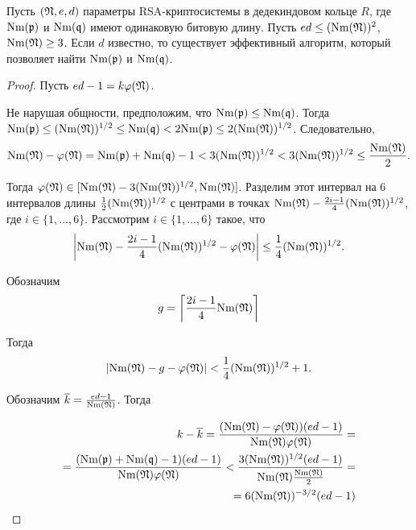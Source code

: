 \documentclass[_00_dissertation.tex]{subfiles}
\begin{document}
\begin{theorem}\label{theorem:d_is_known_2}
    Пусть $(\mathfrak{N}, e, d)$ параметры RSA-криптосистемы в дедекиндовом кольце $R$, где $\textrm{Nm}(\mathfrak{p})$ и $\textrm{Nm}(\mathfrak{q})$ имеют одинаковую битовую длину.
    Пусть $ed \le (\textrm{Nm}(\mathfrak{N}))^2$, $\textrm{Nm}(\mathfrak{N}) \ge 3$.
    Если $d$ известно, то существует эффективный алгоритм, который позволяет найти $\textrm{Nm}(\mathfrak{p})$ и $\textrm{Nm}(\mathfrak{q})$.
\end{theorem}
\begin{proof}
    Пусть $ed - 1 = k\varphi(\mathfrak{N})$.

    Не нарушая общности, предположим, что $\textrm{Nm}(\mathfrak{p}) \le \textrm{Nm}(\mathfrak{q})$.
    Тогда $\textrm{Nm}(\mathfrak{p}) \le (\textrm{Nm}(\mathfrak{N}))^{1/2} \le \textrm{Nm}(\mathfrak{q}) < 2\textrm{Nm}(\mathfrak{p}) \le 2(\textrm{Nm}(\mathfrak{N}))^{1/2}$.
    Следовательно,
    \begin{equation*}
        \textrm{Nm}(\mathfrak{N}) - \varphi(\mathfrak{N}) = \textrm{Nm}(\mathfrak{p}) + \textrm{Nm}(\mathfrak{q}) - 1 < 3(\textrm{Nm}(\mathfrak{N}))^{1/2} < 3(\textrm{Nm}(\mathfrak{N}))^{1/2} \le \frac{\textrm{Nm}(\mathfrak{N})}{2}.
    \end{equation*}

    Тогда $\varphi(\mathfrak{N}) \in [\textrm{Nm}(\mathfrak{N})-3(\textrm{Nm}(\mathfrak{N}))^{1/2}, \textrm{Nm}(\mathfrak{N})]$.
    Разделим этот интервал на $6$ интервалов длины $\frac{1}{2}(\textrm{Nm}(\mathfrak{N}))^{1/2}$ с центрами в точках $\textrm{Nm}(\mathfrak{N}) - \frac{2i-1}{4}(\textrm{Nm}(\mathfrak{N}))^{1/2}$, где $i \in \{1, \ldots, 6\}$.
    Рассмотрим $i \in \{1, \ldots, 6\}$ такое, что
    \begin{equation*}
        \left|
            \textrm{Nm}(\mathfrak{N})-\frac{2i-1}{4}(\textrm{Nm}(\mathfrak{N}))^{1/2}-\varphi(\mathfrak{N})
        \right| \le \frac{1}{4}(\textrm{Nm}(\mathfrak{N}))^{1/2}.
    \end{equation*}
  
    Обозначим
    \begin{equation*}
        g = \left\lceil
            \frac{2i-1}{4}\textrm{Nm}(\mathfrak{N})
        \right\rceil
    \end{equation*}

    Тогда
    \begin{equation*}
        \left|
            \textrm{Nm}(\mathfrak{N}) - g - \varphi(\mathfrak{N})
        \right| < \frac{1}{4}(\textrm{Nm}(\mathfrak{N}))^{1/2} + 1.
    \end{equation*}

    Обозначим $\overline{k} = \frac{ed-1}{\textrm{Nm}(\mathfrak{N})}$.
    Тогда

    \begin{equation*}
        \begin{split}
            k - \overline{k} =
            \frac{(\textrm{Nm}(\mathfrak{N})-\varphi(\mathfrak{N}))(ed-1)}{\textrm{Nm}(\mathfrak{N})\varphi(\mathfrak{N})} =\\
            = \frac{(\textrm{Nm}(\mathfrak{p})+\textrm{Nm}(\mathfrak{q})-1)(ed-1)}{\textrm{Nm}(\mathfrak{N})\varphi(\mathfrak{N})} < \frac{3(\textrm{Nm}(\mathfrak{N}))^{1/2}(ed-1)}{\textrm{Nm}(\mathfrak{N})\frac{\textrm{Nm}(\mathfrak{N})}{2}} =\\
            = 6(\textrm{Nm}(\mathfrak{N}))^{-3/2}(ed-1)
        \end{split}
    \end{equation*}
  

\end{proof}
\end{document}
